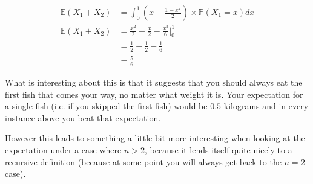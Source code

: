 \documentclass[12pt]{article}
\begin{document}
$$
	\begin{aligned}
		\mathbb{E}(X_1 + X_2) &= \int_0^1 \left(x + \frac{1-x^2}{2}\right) \times \mathbb{P}(X_1 = x) dx\\
		\mathbb{E}(X_1 + X_2) &= \frac{x^2}{2} + \frac{x}{2} - \frac{x^3}{6}\bigg\vert_0^1\\
		&= \frac{1}{2} + \frac{1}{2} - \frac{1}{6}\\
		&= \frac{5}{6}
	\end{aligned}
$$

What is interesting about this is that it suggests that you should always eat the first fish that comes your way, no matter what weight it is. Your expectation for a single fish (i.e. if you skipped the first fish) would be $0.5$ kilograms and in every instance above you beat that expectation. 

However this leads to something a little bit more interesting when looking at the expectation under a case where $n > 2$, because it lends itself quite nicely to a recursive definition (because at some point you will always get back to the $n=2$ case). 
\end{document}
